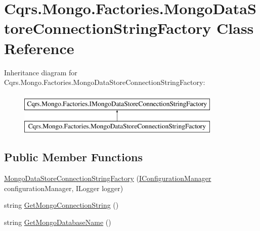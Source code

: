 \hypertarget{classCqrs_1_1Mongo_1_1Factories_1_1MongoDataStoreConnectionStringFactory}{}\section{Cqrs.\+Mongo.\+Factories.\+Mongo\+Data\+Store\+Connection\+String\+Factory Class Reference}
\label{classCqrs_1_1Mongo_1_1Factories_1_1MongoDataStoreConnectionStringFactory}
Inheritance diagram for Cqrs.\+Mongo.\+Factories.\+Mongo\+Data\+Store\+Connection\+String\+Factory\+:\begin{figure}[H]
\begin{center}
\leavevmode
\includegraphics[height=2.000000cm]{classCqrs_1_1Mongo_1_1Factories_1_1MongoDataStoreConnectionStringFactory}
\end{center}
\end{figure}
\subsection*{Public Member Functions}
\begin{DoxyCompactItemize}
\item 
\hyperlink{classCqrs_1_1Mongo_1_1Factories_1_1MongoDataStoreConnectionStringFactory_acad4a48959c7d40b5934663d1b71f414_acad4a48959c7d40b5934663d1b71f414}{Mongo\+Data\+Store\+Connection\+String\+Factory} (\hyperlink{interfaceCqrs_1_1Configuration_1_1IConfigurationManager}{I\+Configuration\+Manager} configuration\+Manager, I\+Logger logger)
\item 
string \hyperlink{classCqrs_1_1Mongo_1_1Factories_1_1MongoDataStoreConnectionStringFactory_a33064b1b1cbf06ef4f9e12371c7ef785_a33064b1b1cbf06ef4f9e12371c7ef785}{Get\+Mongo\+Connection\+String} ()
\item 
string \hyperlink{classCqrs_1_1Mongo_1_1Factories_1_1MongoDataStoreConnectionStringFactory_a7f330359f2db5b86ad28ac7d8a4c49f1_a7f330359f2db5b86ad28ac7d8a4c49f1}{Get\+Mongo\+Database\+Name} ()
\end{DoxyCompactItemize}
